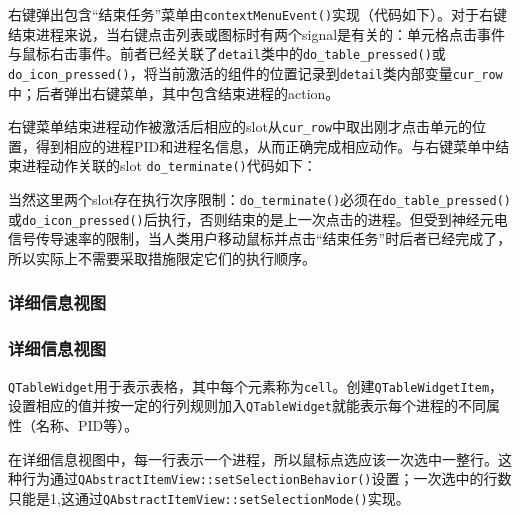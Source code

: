 \documentclass{beamer}
\newcommand\code[1]{\texttt{#1}}
\begin{document}
\begin{frame}
右键弹出包含``结束任务''菜单由\code{contextMenuEvent()}实现（代码如下）。对于右键结束进程来说，当右键点击列表或图标时有两个signal是有关的：单元格点击事件与鼠标右击事件。前者已经关联了\code{detail}类中的\code{do\_table\_pressed()}或\code{do\_icon\_pressed()}，将当前激活的组件的位置记录到\code{detail}类内部变量\code{cur\_row}中；后者弹出右键菜单，其中包含结束进程的action。

{
    \ttfamily
    
}
\end{frame}

\begin{frame}
    
右键菜单结束进程动作被激活后相应的slot从\code{cur\_row}中取出刚才点击单元的位置，得到相应的进程PID和进程名信息，从而正确完成相应动作。与右键菜单中结束进程动作关联的slot \code{do\_terminate()}代码如下：

\end{frame}

\begin{frame}
    
{
    \ttfamily
    
}

\end{frame}

\begin{frame}
当然这里两个slot存在执行次序限制：\code{do\_terminate()}必须在\code{do\_table\_pressed()}或\code{do\_icon\_pressed()}后执行，否则结束的是上一次点击的进程。但受到神经元电信号传导速率的限制，当人类用户移动鼠标并点击“结束任务”时后者已经完成了，所以实际上不需要采取措施限定它们的执行顺序。
\end{frame}

\subsubsection{详细信息视图}
\begin{frame}
    \frametitle{详细信息视图}
    \code{QTableWidget}用于表示表格，其中每个元素称为\code{cell}。创建\code{QTableWidgetItem}，设置相应的值并按一定的行列规则加入\code{QTableWidget}就能表示每个进程的不同属性（名称、PID等）。

在详细信息视图中，每一行表示一个进程，所以鼠标点选应该一次选中一整行。这种行为通过\code{QAbstractItemView::setSelectionBehavior()}设置；一次选中的行数只能是1,这通过\code{QAbstractItemView::setSelectionMode()}实现。
\end{frame}
\end{document}
